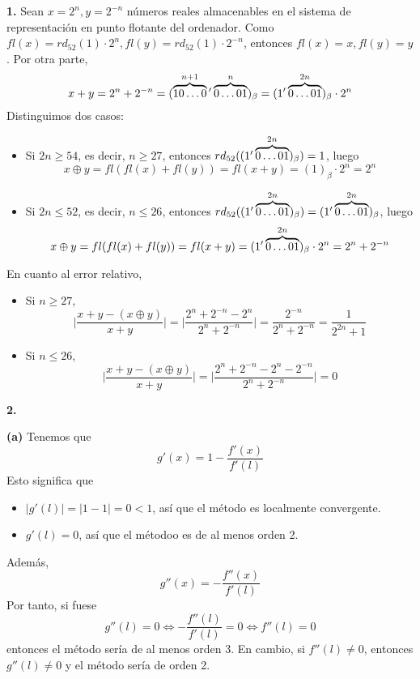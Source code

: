 \documentclass[12pt]{report}
\begin{document}
\textbf{1. } Sean $x = 2^n, y = 2^{-n}$ números reales almacenables en el sistema de representación en punto flotante del ordenador. Como $fl(x) = rd_{52}(1) \cdot 2^n, fl(y) = rd_{52}(1) \cdot 2^{-n}$, entonces $fl(x) = x, fl(y) = y$. Por otra parte,
\[x + y = 2^n + 2^{-n} = (\overbrace{10 \mathellipsis 0}^{n+1}{'}  \overbrace{0\mathellipsis01}^{n})_\beta = (1'\overbrace{0 \mathellipsis 0 1}^{2n})_\beta \cdot 2^n\]
Distinguimos dos casos:
\begin{itemize}
    \item Si $2n \geq 54$, es decir, $n \geq 27$, entonces $rd_{52}((1'\overbrace{0 \mathellipsis 0 1}^{2n})_\beta) = 1$, luego
    \[x \oplus y = fl(fl(x) + fl(y)) = fl(x + y) = (1)_\beta \cdot 2^n = 2^n\]
    \item Si $2n \leq 52$, es decir, $n \leq 26$, entonces $rd_{52}((1'\overbrace{0 \mathellipsis 0 1}^{2n})_\beta) = (1'\overbrace{0 \mathellipsis 0 1}^{2n})_\beta$, luego
    \[x \oplus y = fl(fl(x) + fl(y)) = fl(x + y) = (1'\overbrace{0 \mathellipsis 0 1}^{2n})_\beta \cdot 2^n = 2^n + 2^{-n}\]
\end{itemize}
En cuanto al error relativo,
\begin{itemize}
    \item Si $n \geq 27$, 
    \[\Biggl|\frac{x+y - (x \oplus y)}{x+y} \Biggr| = \Biggl|\frac{2^n + 2^{-n} - 2^n}{2^n + 2^{-n}} \Biggr| = \frac{2^{-n}}{2^n + 2^{-n}} = \frac{1}{2^{2n}+1}\]
    \item Si $n \leq 26$, 
    \[\Biggl|\frac{x+y - (x \oplus y)}{x+y} \Biggr| = \Biggl|\frac{2^n + 2^{-n} - 2^n - 2^{-n}}{2^n + 2^{-n}} \Biggr| = 0\]
\end{itemize}

\vspace{2mm}
\textbf{2. }

\vspace{2mm}
\textbf{(a)} Tenemos que
\[g'(x) = 1 - \frac{f'(x)}{f'(l)}\]
Esto significa que
\begin{itemize}
    \item $|g'(l)| = |1 - 1| = 0 < 1$, así que el método es localmente convergente.
    \item $g'(l) = 0$, así que el métodoo es de al menos orden 2.
\end{itemize}
Además,
\[g''(x) = - \frac{f''(x)}{f'(l)}\]
Por tanto, si fuese
\[g''(l) = 0 \iff -\frac{f''(l)}{f'(l)} = 0 \iff f''(l) = 0\]
entonces el método sería de al menos orden 3. En cambio, si $f''(l) \neq 0$, entonces $g''(l) \neq 0$ y el método sería de orden 2.
\end{document}
